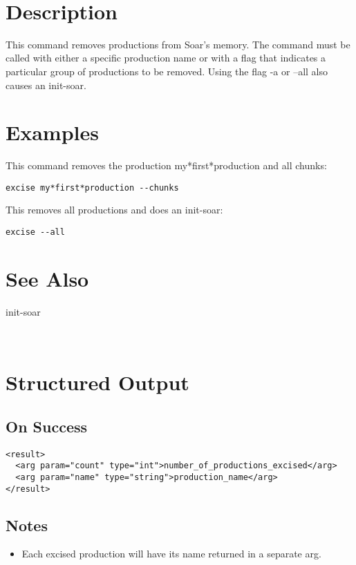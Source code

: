 \documentclass[10pt]{article}
\begin{document}
 \\ 

\section*{ Description }


 This command removes productions from Soar's memory. The command must be called with either a specific production name or with a flag that indicates a particular group of productions to be removed. Using the flag -a or --all also causes an init-soar. 
\section*{ Examples }


 This command removes the production my*first*production and all chunks: \begin{verbatim}
excise my*first*production --chunks

\end{verbatim}



 This removes all productions and does an init-soar: \begin{verbatim}
excise --all

\end{verbatim}

\section*{ See Also }
\begin{description}
init-soar

\end{description}


 \\ 

\section*{ Structured Output }
\subsection*{ On Success }
\begin{verbatim}
<result>
  <arg param="count" type="int">number_of_productions_excised</arg>
  <arg param="name" type="string">production_name</arg>
</result>

\end{verbatim}
\subsection*{ Notes }
\begin{itemize}
\item  Each excised production will have its name returned in a separate arg. 

\end{itemize}
\end{document}
